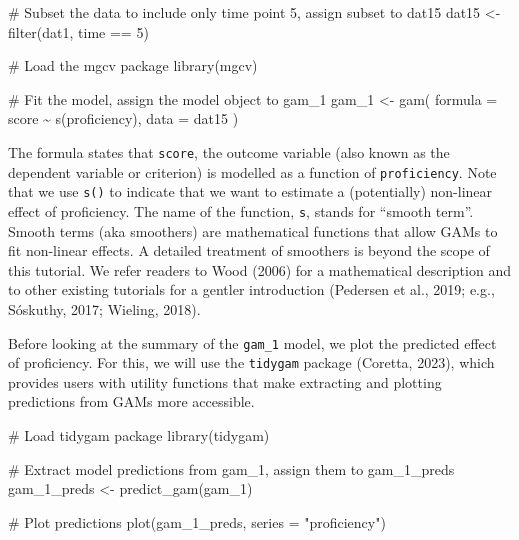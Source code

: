 \documentclass[
  letterpaper,
  DIV=11,
  numbers=noendperiod]{scrartcl}
\newenvironment{Shaded}{\begin{snugshade}}{\end{snugshade}}
\newcommand{\AttributeTok}[1]{\textcolor[rgb]{0.40,0.45,0.13}{#1}}
\newcommand{\CommentTok}[1]{\textcolor[rgb]{0.37,0.37,0.37}{#1}}
\newcommand{\DecValTok}[1]{\textcolor[rgb]{0.68,0.00,0.00}{#1}}
\newcommand{\FunctionTok}[1]{\textcolor[rgb]{0.28,0.35,0.67}{#1}}
\newcommand{\NormalTok}[1]{\textcolor[rgb]{0.00,0.23,0.31}{#1}}
\newcommand{\OtherTok}[1]{\textcolor[rgb]{0.00,0.23,0.31}{#1}}
\newcommand{\SpecialCharTok}[1]{\textcolor[rgb]{0.37,0.37,0.37}{#1}}
\newcommand{\StringTok}[1]{\textcolor[rgb]{0.13,0.47,0.30}{#1}}
\begin{document}
\begin{Shaded}
\begin{Highlighting}[]
\CommentTok{\# Subset the data to include only time point 5, assign subset to \textquotesingle{}dat15\textquotesingle{}}
\NormalTok{dat15 }\OtherTok{\textless{}{-}} \FunctionTok{filter}\NormalTok{(dat1, time }\SpecialCharTok{==} \DecValTok{5}\NormalTok{)}

\CommentTok{\# Load the mgcv package}
\FunctionTok{library}\NormalTok{(mgcv)}

\CommentTok{\# Fit the model, assign the model object to \textquotesingle{}gam\_1\textquotesingle{}}
\NormalTok{gam\_1 }\OtherTok{\textless{}{-}} \FunctionTok{gam}\NormalTok{(}
  \AttributeTok{formula =}\NormalTok{ score }\SpecialCharTok{\textasciitilde{}} \FunctionTok{s}\NormalTok{(proficiency),}
  \AttributeTok{data =}\NormalTok{ dat15}
\NormalTok{)}
\end{Highlighting}
\end{Shaded}

The formula states that \texttt{score}, the outcome variable (also known
as the dependent variable or criterion) is modelled as a function of
\texttt{proficiency}. Note that we use \texttt{s()} to indicate that we
want to estimate a (potentially) non-linear effect of proficiency. The
name of the function, \texttt{s}, stands for ``smooth term''. Smooth
terms (aka smoothers) are mathematical functions that allow GAMs to fit
non-linear effects. A detailed treatment of smoothers is beyond the
scope of this tutorial. We refer readers to Wood (2006) for a
mathematical description and to other existing tutorials for a gentler
introduction (Pedersen et al., 2019; e.g., Sóskuthy, 2017; Wieling,
2018).

Before looking at the summary of the \texttt{gam\_1} model, we plot the
predicted effect of proficiency. For this, we will use the
\texttt{tidygam} package (Coretta, 2023), which provides users with
utility functions that make extracting and plotting predictions from
GAMs more accessible.

\begin{Shaded}
\begin{Highlighting}[]
\CommentTok{\# Load tidygam package}
\FunctionTok{library}\NormalTok{(tidygam)}

\CommentTok{\# Extract model predictions from \textquotesingle{}gam\_1\textquotesingle{}, assign them to \textquotesingle{}gam\_1\_preds\textquotesingle{}}
\NormalTok{gam\_1\_preds }\OtherTok{\textless{}{-}} \FunctionTok{predict\_gam}\NormalTok{(gam\_1)}

\CommentTok{\# Plot predictions}
\FunctionTok{plot}\NormalTok{(gam\_1\_preds, }\AttributeTok{series =} \StringTok{"proficiency"}\NormalTok{)}
\end{Highlighting}
\end{Shaded}
\end{document}
